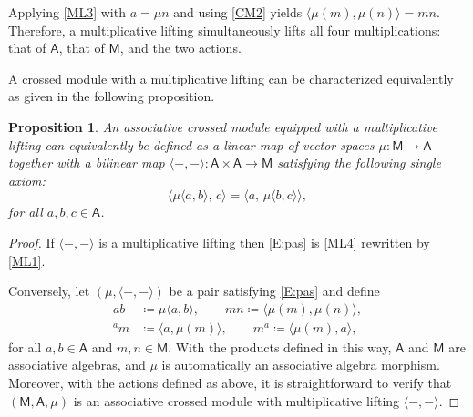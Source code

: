 \documentclass[12pt,reqno]{amsart}
\theoremstyle{plain}
\newtheorem{proposition}[theorem]{Proposition}
\theoremstyle{definition}
\theoremstyle{remark}
\newcommand{\A}{\ensuremath{\mathsf{A}}}
\newcommand{\MM}{\ensuremath{\mathsf{M}}}
\numberwithin{equation}{section}
\begin{document}
Applying \eqref{ML3} with $a=\mu n$ and using \eqref{CM2} yields $\langle\mu (m),\mu (n)\rangle=mn$. Therefore, a multiplicative lifting simultaneously lifts all four multiplications: that of $\A$, that of $\MM$, and the two actions.

A crossed module with a multiplicative lifting can be characterized equivalently as given in the following proposition.

\begin{proposition}\label{P:single}
An associative crossed module equipped with a multiplicative lifting can equivalently be defined as a linear map of vector spaces $\mu \colon \MM\to \A$
 together with a bilinear map $\langle-,-\rangle\colon \A \times \A\to \MM$ satisfying the following single axiom:
\begin{equation} \label{E:pas}
	\bigl\langle \mu \langle a,b\rangle,\,c\bigr\rangle
	=\bigl\langle a,\,\mu \langle b,c \rangle\bigr\rangle ,
\end{equation}
	for all $a,b,c\in \A$.
\end{proposition}

\begin{proof}
	If $\langle-,-\rangle$ is a multiplicative lifting then \eqref{E:pas} is \eqref{ML4}
	rewritten by \eqref{ML1}. 
	
	Conversely, let $(\mu,\langle-,-\rangle)$ be a pair satisfying \eqref{E:pas} and define
	\begin{align*}
	a b & \coloneqq \mu \langle a ,b \rangle,\qquad  
	m n  \coloneqq \langle \mu (m),\mu (n) \rangle, \\
	{}^a m & \coloneqq  \langle a,\mu(m)\rangle,\qquad 
	m^a   \coloneqq  \langle \mu(m),a\rangle,
	\end{align*}
	for all $a,b\in \A$ and $m,n\in\MM$. With the products defined in this way, $\A$ and $\MM$ are associative algebras, and $\mu$ is automatically an associative algebra morphism.
	 Moreover, with the actions defined as above, it is straightforward to verify that $(\MM,\A,\mu)$ is an associative crossed module with multiplicative lifting $\langle -,-\rangle$.
\end{proof}
\end{document}
